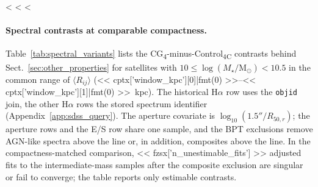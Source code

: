 \documentclass{aa}
\newcommand{\CC}{Control\textsubscript{4C}}
\newcommand{\CG}{CG\textsubscript{4}}
\newcommand{\msun}{\mathrm{M}_\odot}
\newcommand{\Rmed}{\langle R_{ij}\rangle}
\begin{document}
\begin{appendix}
<%
<%
<%
\paragraph{Spectral contrasts at comparable compactness.} Table~\ref{tab:spectral_variants} lists the \CG{}-minus-\CC{} contrasts behind Sect.~\ref{sec:other_properties} for satellites with \(10 \le \log(M_\star/\msun) < 10.5\) in the common range of \(\Rmed\) (<< cptx['window_kpc'][0]|fmt(0) >>--<< cptx['window_kpc'][1]|fmt(0) >>~kpc). The historical H\(\alpha\) row uses the \texttt{objid} join, the other H\(\alpha\) rows the stored spectrum identifier (Appendix~\ref{app:sdss_query}). The aperture covariate is \(\log_{10}(1.5''/R_{50,r})\); the aperture rows and the E/S row share one sample, and the BPT exclusions remove AGN-like spectra above the \citet{Kewley+01} line or, in addition, composites above the \citet{Kauffmann+03a} line. In the compactness-matched comparison, << fzsx['n_unestimable_fits'] >> adjusted fits to the intermediate-mass samples after the composite exclusion are singular or fail to converge; the table reports only estimable contrasts.


\end{appendix}
\end{document}
